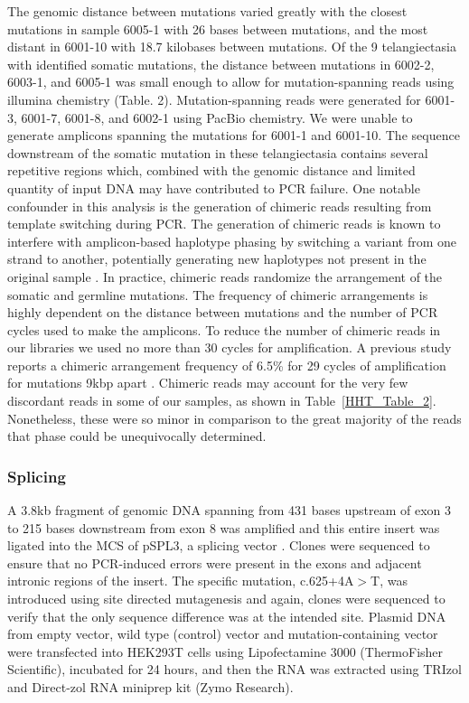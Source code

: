 The genomic distance between mutations varied greatly with the closest mutations in sample 6005-1 with 26 bases between mutations, and the most distant in 6001-10 with 18.7 kilobases between mutations. Of the 9 telangiectasia with identified somatic mutations, the distance between mutations in 6002-2, 6003-1, and 6005-1 was small enough to allow for mutation-spanning reads using illumina chemistry (Table. 2). Mutation-spanning reads were generated for 6001-3, 6001-7, 6001-8, and 6002-1 using PacBio chemistry. We were unable to generate amplicons spanning the mutations for 6001-1 and 6001-10. The sequence downstream of the somatic mutation in these telangiectasia contains several repetitive regions which, combined with the genomic distance and limited quantity of input DNA may have contributed to PCR failure. 
One notable confounder in this analysis is the generation of chimeric reads resulting from template switching during PCR. The generation of chimeric reads is known to interfere with amplicon-based haplotype phasing by switching a variant from one strand to another, potentially generating new haplotypes not present in the original sample \citep{laver2016}. In practice, chimeric reads randomize the arrangement of the somatic and germline mutations. The frequency of chimeric arrangements is highly dependent on the distance between mutations and the number of PCR cycles used to make the amplicons. To reduce the number of chimeric reads in our libraries we used no more than 30 cycles for amplification. A previous study reports a chimeric arrangement frequency of 6.5\% for 29 cycles of amplification for mutations 9kbp apart \citep{laver2016}. Chimeric reads may account for the very few discordant reads in some of our samples, as shown in Table~\ref{HHT_Table_2}.  Nonetheless, these were so minor in comparison to the great majority of the reads that phase could be unequivocally determined.

\subsubsection{ Splicing}
A 3.8kb fragment of  genomic DNA spanning from 431 bases upstream of exon 3 to 215 bases downstream from exon 8 was amplified and this entire insert was ligated into the MCS of pSPL3, a splicing vector \citep{church1994}.  Clones were sequenced to ensure that no PCR-induced errors were present in the exons and adjacent intronic regions of the insert.  The specific mutation, c.625+4A$>$T, was introduced using site directed mutagenesis and again, clones were sequenced to verify that the only sequence difference was at the intended site. Plasmid DNA from empty vector, wild type (control) vector and mutation-containing vector were transfected into HEK293T cells using Lipofectamine 3000 (ThermoFisher Scientific), incubated for 24 hours, and then the RNA was extracted using TRIzol and Direct-zol RNA miniprep kit (Zymo Research).  

